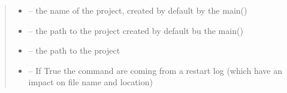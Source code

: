\documentclass[letterpaper,10pt,english]{sphinxmanual}
\begin{document}
\begin{fulllineitems}
\begin{quote}
\begin{description}
\begin{itemize}
\item {} 
 -- the name of the project, created by default by the main()

\item {} 
 -- the path to the project created by default bu the main()

\item {} 
 -- the path to the project

\item {} 
 -- If True the command are coming from a restart log (which have an impact on file name and
location)

\end{itemize}

\end{description}\end{quote}

\end{fulllineitems}

\end{document}
